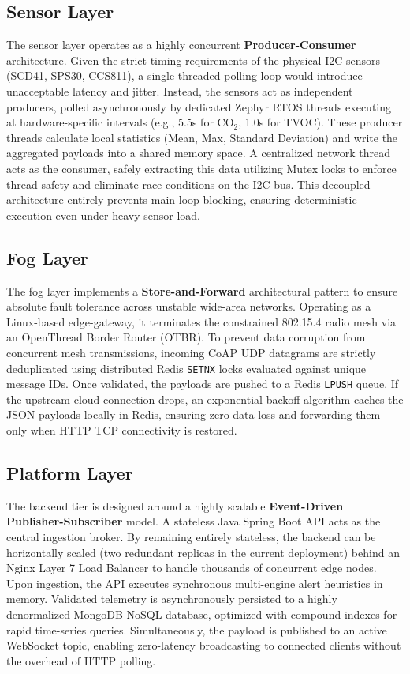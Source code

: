 \documentclass[conference]{IEEEtran}
\begin{document}
\subsection{Sensor Layer}
The sensor layer operates as a highly concurrent \textbf{Producer-Consumer} architecture. Given the strict timing requirements of the physical I2C sensors (SCD41, SPS30, CCS811), a single-threaded polling loop would introduce unacceptable latency and jitter. Instead, the sensors act as independent producers, polled asynchronously by dedicated Zephyr RTOS threads executing at hardware-specific intervals (e.g., 5.5s for CO$_2$, 1.0s for TVOC). These producer threads calculate local statistics (Mean, Max, Standard Deviation) and write the aggregated payloads into a shared memory space. A centralized network thread acts as the consumer, safely extracting this data utilizing Mutex locks to enforce thread safety and eliminate race conditions on the I2C bus. This decoupled architecture entirely prevents main-loop blocking, ensuring deterministic execution even under heavy sensor load.

\subsection{Fog Layer}
The fog layer implements a \textbf{Store-and-Forward} architectural pattern to ensure absolute fault tolerance across unstable wide-area networks. Operating as a Linux-based edge-gateway, it terminates the constrained 802.15.4 radio mesh via an OpenThread Border Router (OTBR). To prevent data corruption from concurrent mesh transmissions, incoming CoAP UDP datagrams are strictly deduplicated using distributed Redis \texttt{SETNX} locks evaluated against unique message IDs. Once validated, the payloads are pushed to a Redis \texttt{LPUSH} queue. If the upstream cloud connection drops, an exponential backoff algorithm caches the JSON payloads locally in Redis, ensuring zero data loss and forwarding them only when HTTP TCP connectivity is restored.

\subsection{Platform Layer}
The backend tier is designed around a highly scalable \textbf{Event-Driven Publisher-Subscriber} model. A stateless Java Spring Boot API acts as the central ingestion broker. By remaining entirely stateless, the backend can be horizontally scaled (two redundant replicas in the current deployment) behind an Nginx Layer 7 Load Balancer to handle thousands of concurrent edge nodes. Upon ingestion, the API executes synchronous multi-engine alert heuristics in memory. Validated telemetry is asynchronously persisted to a highly denormalized MongoDB NoSQL database, optimized with compound indexes for rapid time-series queries. Simultaneously, the payload is published to an active WebSocket topic, enabling zero-latency broadcasting to connected clients without the overhead of HTTP polling.
\end{document}
